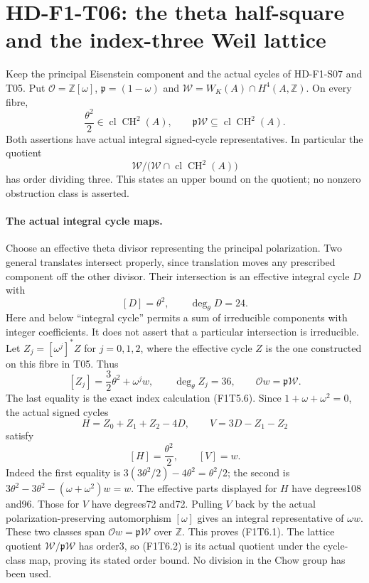 \section{HD-F1-T06: the theta half-square and the index-three Weil lattice}
\label{sec:f1-integral-saturation}

Keep the principal Eisenstein component and the actual cycles of
HD-F1-S07 and T05. Put $\mathcal O=\mathbb Z[\omega]$,
$\mathfrak p=(1-\omega)$ and
$\mathscr W=W_K(A)\cap H^4(A,\mathbb Z)$. On every fibre,
\[
 \boxed{\frac{\theta^2}{2}\in\operatorname{cl}\operatorname{CH}^2(A),
 \qquad \mathfrak p\mathscr W
       \subseteq\operatorname{cl}\operatorname{CH}^2(A).}
 \tag{F1T6.1}
\]
Both assertions have actual integral signed-cycle representatives.
In particular the quotient
\[
 \mathscr W\big/
 \bigl(\mathscr W\cap\operatorname{cl}\operatorname{CH}^2(A)\bigr)
 \tag{F1T6.2}
\]
has order dividing three. This states an upper bound on the
quotient; no nonzero obstruction class is asserted.

\paragraph{The actual integral cycle maps.}
Choose an effective theta divisor representing the principal
polarization. Two general translates intersect properly, since
translation moves any prescribed component off the other divisor.
Their intersection is an effective integral cycle $D$ with
\[
             [D]=\theta^2,\qquad \deg_\theta D=24.
 \tag{F1T6.3}
\]
Here and below ``integral cycle'' permits a sum of irreducible
components with integer coefficients. It does not assert that a
particular intersection is irreducible. Let
$Z_j=[\omega^j]^*Z$ for $j=0,1,2$, where the effective cycle
$Z$ is the one constructed on this fibre in T05. Thus
\[
 [Z_j]=\frac32\theta^2+\omega^jw,
 \qquad \deg_\theta Z_j=36,
 \qquad \mathcal O w=\mathfrak p\mathscr W.
 \tag{F1T6.4}
\]
The last equality is the exact index calculation (F1T5.6).
Since $1+\omega+\omega^2=0$, the actual signed cycles
\[
 H=Z_0+Z_1+Z_2-4D,
 \qquad V=3D-Z_1-Z_2
 \tag{F1T6.5}
\]
satisfy
\[
 [H]=\frac{\theta^2}{2},\qquad [V]=w.
 \tag{F1T6.6}
\]
Indeed the first equality is
$3(3\theta^2/2)-4\theta^2=\theta^2/2$; the second is
$3\theta^2-3\theta^2-(\omega+\omega^2)w=w$.
The effective parts displayed for $H$ have degrees108 and96.
Those for $V$ have degrees72 and72. Pulling $V$ back by the
actual polarization-preserving automorphism $[\omega]$ gives
an integral representative of $\omega w$. These two classes
span $\mathcal O w=\mathfrak p\mathscr W$ over $\mathbb Z$.
This proves (F1T6.1). The lattice quotient
$\mathscr W/\mathfrak p\mathscr W$ has order3, so (F1T6.2)
is its actual quotient under the cycle-class map, proving its
stated order bound. No division in the Chow group has been used.

